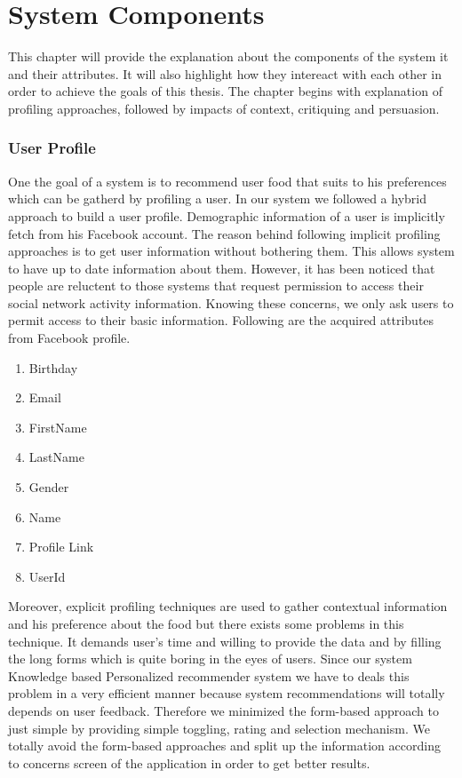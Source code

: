 
\chapter{System Components}

This chapter will provide the explanation about the components of the system it and their attributes. It will also highlight how they intereact with each other in order to achieve the goals of this thesis. The chapter begins with explanation of profiling approaches, followed by impacts of context, critiquing and persuasion.

\subsection{User Profile}

One the goal of a system is to recommend user food that suits to his preferences which can be gatherd by profiling a user. In our system we followed a hybrid approach to build a user profile. Demographic information of a user is implicitly fetch from his Facebook account. The reason behind following implicit profiling approaches is to get user information without bothering them. This allows system to  have up to date information about them.  However, it has been noticed that people are reluctent to those systems that request permission to access their social network activity information. Knowing these concerns, we only ask users to permit access to their basic information. Following are the acquired attributes from Facebook profile.

\begin{enumerate}
	\item Birthday
	\item Email	
	\item FirstName
	\item LastName
	\item Gender
	\item Name
	\item Profile Link
	\item UserId
\end{enumerate}

Moreover, explicit profiling techniques are used to gather contextual information and his preference about the food but there exists some problems in this technique. It demands user’s time and willing to provide the data and by filling the long forms which is quite boring in the eyes of users. Since our system Knowledge based Personalized recommender system we have to deals this problem in a very efficient manner because system recommendations will totally depends on user feedback. Therefore we minimized the form-based approach to just simple by providing simple toggling, rating and selection mechanism. We totally avoid the form-based approaches and split up the information according to concerns screen of the application in order to get better results.

